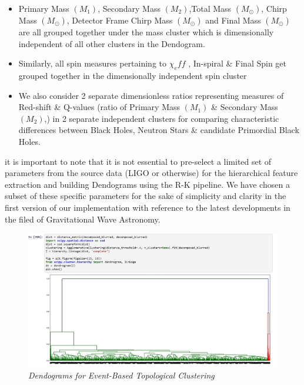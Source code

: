    \begin{itemize}
   	\item Primary Mass $(M_1)$, Secondary Mass $(M_2)$,Total Mass $(M_\odot)$, Chirp Mass $(M_\odot)$, Detector Frame Chirp Mass $(M_\odot)$ and Final Mass $(M_\odot)$ are all grouped together under the mass cluster which is dimensionally independent of all other clusters in the Dendogram. 
   	\item Similarly, all spin measures pertaining to $\chi_eff $ , In-spiral \& Final Spin get grouped together in the dimensionally independent spin cluster
   	\item We also consider 2 separate dimensionless ratios representing measures of Red-shift \& Q-values (ratio of Primary Mass $(M_1)$ \& Secondary Mass $(M_2)$,) in 2 separate independent clusters for comparing characteristic differences between Black Holes, Neutron Stars \& candidate Primordial Black Holes.
   \end{itemize}  
   
   it is important to note that it is not essential to pre-select a limited set of parameters from the source data (LIGO or otherwise) for the hierarchical feature extraction and building Dendograms using the R-K pipeline. We have chosen a subset of these specific parameters for the sake of simplicity and clarity in the first version of our implementation with reference to the latest developments in the filed of Gravitational Wave Astronomy.
   
   \begin{figure}[H]
   	\centering
   	\includegraphics[width=1.0\linewidth]{images/56_12_Dendograms for Event Based Custering.jpg}
   	\caption{\textit{Dendograms for Event-Based Topological Clustering }}
   	\label{fig:LIGO7_PlaceHolder_fig}
   \end{figure}
   

